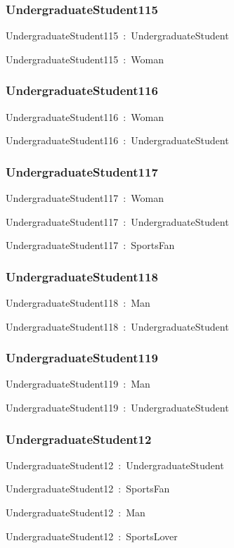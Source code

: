 \documentclass{article}
\begin{document}
\subsubsection*{UndergraduateStudent115}

UndergraduateStudent115~:~UndergraduateStudent

UndergraduateStudent115~:~Woman

\subsubsection*{UndergraduateStudent116}

UndergraduateStudent116~:~Woman

UndergraduateStudent116~:~UndergraduateStudent

\subsubsection*{UndergraduateStudent117}

UndergraduateStudent117~:~Woman

UndergraduateStudent117~:~UndergraduateStudent

UndergraduateStudent117~:~SportsFan

\subsubsection*{UndergraduateStudent118}

UndergraduateStudent118~:~Man

UndergraduateStudent118~:~UndergraduateStudent

\subsubsection*{UndergraduateStudent119}

UndergraduateStudent119~:~Man

UndergraduateStudent119~:~UndergraduateStudent

\subsubsection*{UndergraduateStudent12}

UndergraduateStudent12~:~UndergraduateStudent

UndergraduateStudent12~:~SportsFan

UndergraduateStudent12~:~Man

UndergraduateStudent12~:~SportsLover
\end{document}
